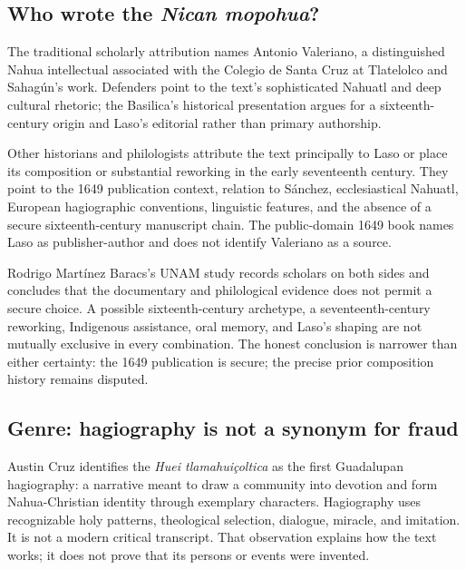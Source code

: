 \subsection{Who wrote the \emph{Nican mopohua}?}

The traditional scholarly attribution names Antonio Valeriano, a distinguished Nahua intellectual associated with the Colegio de Santa Cruz at Tlatelolco and Sahagún's work. Defenders point to the text's sophisticated Nahuatl and deep cultural rhetoric; the Basilica's historical presentation argues for a sixteenth-century origin and Laso's editorial rather than primary authorship.

Other historians and philologists attribute the text principally to Laso or place its composition or substantial reworking in the early seventeenth century. They point to the 1649 publication context, relation to Sánchez, ecclesiastical Nahuatl, European hagiographic conventions, linguistic features, and the absence of a secure sixteenth-century manuscript chain. The public-domain 1649 book names Laso as publisher-author and does not identify Valeriano as a source.

Rodrigo Martínez Baracs's UNAM study records scholars on both sides and concludes that the documentary and philological evidence does not permit a secure choice. A possible sixteenth-century archetype, a seventeenth-century reworking, Indigenous assistance, oral memory, and Laso's shaping are not mutually exclusive in every combination. The honest conclusion is narrower than either certainty: the 1649 publication is secure; the precise prior composition history remains disputed.


\subsection{Genre: hagiography is not a synonym for fraud}

Austin Cruz identifies the \emph{Huei tlamahuiçoltica} as the first Guadalupan hagiography: a narrative meant to draw a community into devotion and form Nahua-Christian identity through exemplary characters. Hagiography uses recognizable holy patterns, theological selection, dialogue, miracle, and imitation. It is not a modern critical transcript. That observation explains how the text works; it does not prove that its persons or events were invented.

